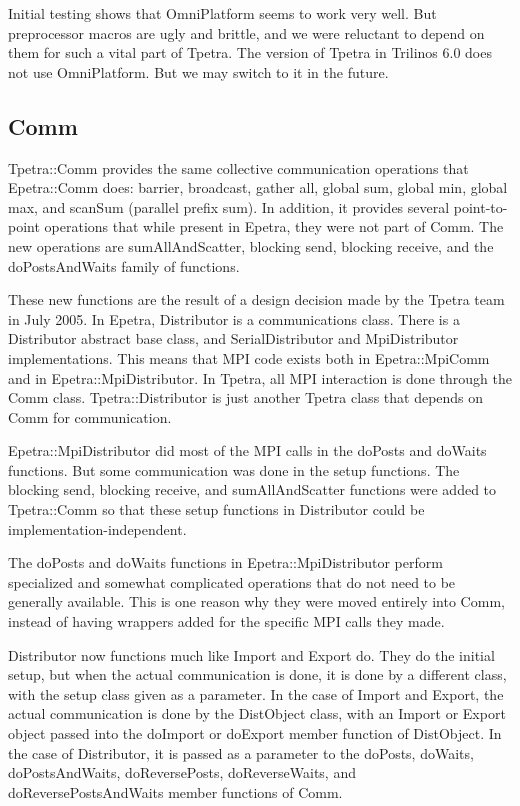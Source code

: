 \documentclass[10pt,relax]{TpetraDesign}
\begin{document}
Initial testing shows that OmniPlatform seems to work very well. But preprocessor macros are ugly and brittle, and we were reluctant to depend on them for such a vital part of Tpetra. The version of Tpetra in Trilinos 6.0 does not use OmniPlatform. But we may switch to it in the future.

%
\subsection{Comm}
Tpetra::Comm provides the same collective communication operations that Epetra::Comm does: barrier, broadcast, gather all, global sum, global min, global max, and scanSum (parallel prefix sum). In addition, it provides several point-to-point operations that while present in Epetra, they were not part of Comm. The new operations are sumAllAndScatter, blocking send, blocking receive, and the doPostsAndWaits family of functions.

These new functions are the result of a design decision made by the Tpetra team in July 2005. In Epetra, Distributor is a communications class. There is a Distributor abstract base class, and SerialDistributor and MpiDistributor implementations. This means that MPI code exists both in Epetra::MpiComm and in Epetra::MpiDistributor. In Tpetra, all MPI interaction is done through the Comm class. Tpetra::Distributor is just another Tpetra class that depends on Comm for communication.

Epetra::MpiDistributor did most of the MPI calls in the doPosts and doWaits functions. But some communication was done in the setup functions. The blocking send, blocking receive, and sumAllAndScatter functions were added to Tpetra::Comm so that these setup functions in Distributor could be implementation-independent. 

The doPosts and doWaits functions in Epetra::MpiDistributor perform specialized and somewhat complicated operations that do not need to be generally available. This is one reason why they were moved entirely into Comm, instead of having wrappers added for the specific MPI calls they made. 

Distributor now functions much like Import and Export do. They do the initial setup, but when the actual communication is done, it is done by a different class, with the setup class given as a parameter. In the case of Import and Export, the actual communication is done by the DistObject class, with an Import or Export object passed into the doImport or doExport member function of DistObject. In the case of Distributor, it is passed as a parameter to the doPosts, doWaits, doPostsAndWaits, doReversePosts, doReverseWaits, and doReversePostsAndWaits member functions of Comm.
\end{document}
